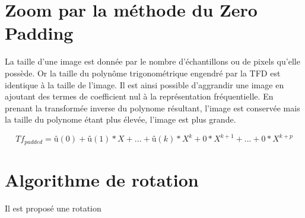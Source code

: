 \documentclass[12pt]{article}
\begin{document}
\section{Zoom par la méthode du Zero Padding}

La taille d'une image est donnée par le nombre d'échantillons ou de pixels qu'elle possède. Or la taille du polynôme trigonométrique engendré par la TFD est identique à la taille de l'image. Il est ainsi possible d'aggrandir une image en ajoutant des termes de coefficient nul à la représentation fréquentielle. En prenant la transformée inverse du polynome résultant, l'image est conservée mais la taille du polynome étant plus élevée, l'image est plus grande. 

\begin{equation}
    Tf_{padded} = û(0) + û(1) * X + ... + û(k) * X^k + 0*X^{k+1} + ... + 0*X^{k+p}
\end{equation}


\section{Algorithme de rotation}

Il est proposé une rotation 
\end{document}
